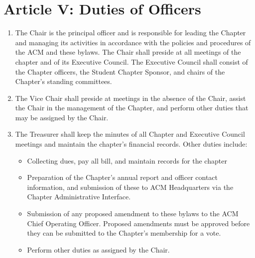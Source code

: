 \section*{Article V: Duties of Officers}

\begin{enumerate}
    \item The Chair is the principal officer and is responsible for leading the Chapter and managing its activities in accordance with the policies and procedures of the ACM and these bylaws.
    The Chair shall preside at all meetings of the chapter and of its Executive Council.
    The Executive Council shall consist of the Chapter officers, the Student Chapter Sponsor, and chairs of the Chapter's standing committees.
    \item The Vice Chair shall preside at meetings in the absence of the Chair, assist the Chair in the management of the Chapter, and perform other duties that may be assigned by the Chair.
    \item The Treasurer shall keep the minutes of all Chapter and Executive Council meetings and maintain the chapter's financial records. Other duties include:
    \begin{itemize}
        \item Collecting dues, pay all bill, and maintain records for the chapter
        \item Preparation of the Chapter's annual report and officer contact information, and submission of these to ACM Headquarters via the Chapter Administrative Interface.
        \item Submission of any proposed amendment to these bylaws to the ACM Chief Operating Officer. Proposed amendments must be approved before they can be submitted to the Chapter's membership for a vote.
        \item Perform other duties as assigned by the Chair.
    \end{itemize}
\end{enumerate}
